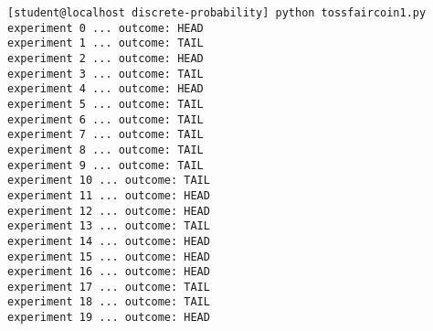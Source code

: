 {\footnotesize \begin{Verbatim}[frame=single,fontsize=\small]
[student@localhost discrete-probability] python tossfaircoin1.py
experiment 0 ... outcome: HEAD
experiment 1 ... outcome: TAIL
experiment 2 ... outcome: HEAD
experiment 3 ... outcome: TAIL
experiment 4 ... outcome: HEAD
experiment 5 ... outcome: TAIL
experiment 6 ... outcome: TAIL
experiment 7 ... outcome: TAIL
experiment 8 ... outcome: TAIL
experiment 9 ... outcome: TAIL
experiment 10 ... outcome: TAIL
experiment 11 ... outcome: HEAD
experiment 12 ... outcome: HEAD
experiment 13 ... outcome: TAIL
experiment 14 ... outcome: HEAD
experiment 15 ... outcome: HEAD
experiment 16 ... outcome: HEAD
experiment 17 ... outcome: TAIL
experiment 18 ... outcome: TAIL
experiment 19 ... outcome: HEAD
\end{Verbatim}
}
